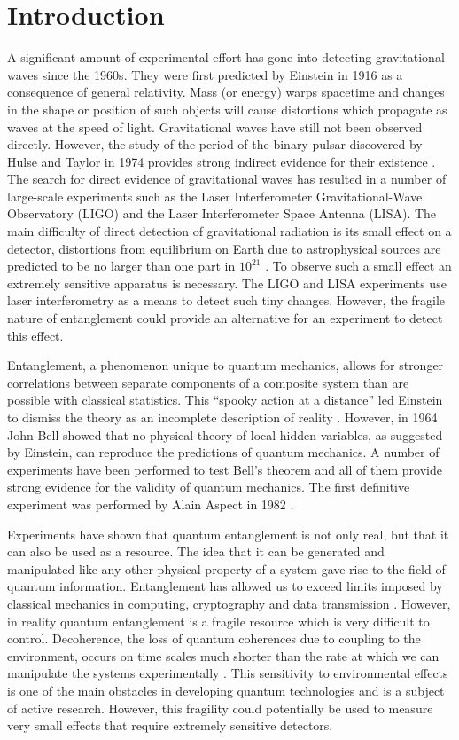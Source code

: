 \section{Introduction}

A significant amount of experimental effort has gone into detecting
gravitational waves since the 1960s. They were first predicted by
Einstein in 1916 as a consequence of general relativity. Mass (or
energy) warps spacetime and changes in the shape or position of such
objects will cause distortions which propagate as waves at the speed
of light. Gravitational waves have still not been observed
directly. However, the study of the period of the binary pulsar
discovered by Hulse and Taylor in 1974 provides strong indirect
evidence for their existence \cite{pulsar}. The search for direct
evidence of gravitational waves has resulted in a number of
large-scale experiments such as the Laser Interferometer
Gravitational-Wave Observatory (LIGO) and the Laser Interferometer
Space Antenna (LISA). The main difficulty of direct detection of
gravitational radiation is its small effect on a detector, distortions
from equilibrium on Earth due to astrophysical sources are predicted
to be no larger than one part in $10^{21}$ \cite{hobson}. To observe
such a small effect an extremely sensitive apparatus is necessary. The
LIGO and LISA experiments use laser interferometry as a means to
detect such tiny changes. However, the fragile nature of entanglement
could provide an alternative for an experiment to detect this effect.

Entanglement, a phenomenon unique to quantum mechanics, allows for
stronger correlations between separate components of a composite
system than are possible with classical statistics. This ``spooky
action at a distance'' led Einstein to dismiss the theory as an
incomplete description of reality \cite{epr}. However, in 1964 John
Bell showed that no physical theory of local hidden variables, as
suggested by Einstein, can reproduce the predictions of quantum
mechanics. A number of experiments have been performed to test Bell's
theorem and all of them provide strong evidence for the validity of
quantum mechanics. The first definitive experiment was performed by
Alain Aspect in 1982 \cite{aspect}.

Experiments have shown that quantum entanglement is not only real, but
that it can also be used as a resource. The idea that it can be
generated and manipulated like any other physical property of a system
gave rise to the field of quantum information. Entanglement has
allowed us to exceed limits imposed by classical mechanics in
computing, cryptography and data transmission \cite{steane}. However,
in reality quantum entanglement is a fragile resource which is very
difficult to control. Decoherence, the loss of quantum coherences due
to coupling to the environment, occurs on time scales much shorter
than the rate at which we can manipulate the systems experimentally
\cite{zurek}. This sensitivity to environmental effects is one of the
main obstacles in developing quantum technologies and is a subject of
active research. However, this fragility could potentially be used to
measure very small effects that require extremely sensitive
detectors. 


